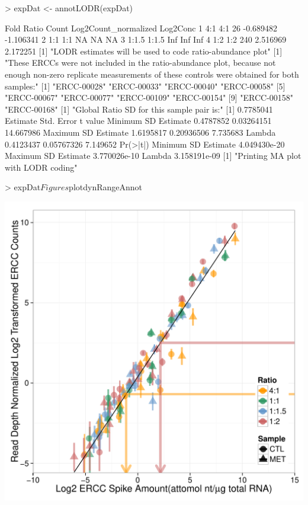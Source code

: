 \documentclass{article}
\begin{document}
\begin{Schunk}
\begin{Sinput}
> expDat <- annotLODR(expDat)
\end{Sinput}
\begin{Soutput}
   Fold Ratio Count Log2Count_normalized  Log2Conc
1   4:1   4:1    26            -0.689482 -1.106341
2   1:1   1:1    NA                   NA        NA
3 1:1.5 1:1.5   Inf                  Inf       Inf
4   1:2   1:2   240             2.516969  2.172251
[1] "LODR estimates will be used to code ratio-abundance plot"
[1] "These ERCCs were not included in the ratio-abundance plot,  because not enough non-zero replicate measurements of these  controls were obtained for both samples:"
 [1] "ERCC-00028" "ERCC-00033" "ERCC-00040" "ERCC-00058"
 [5] "ERCC-00067" "ERCC-00077" "ERCC-00109" "ERCC-00154"
 [9] "ERCC-00158" "ERCC-00168"
[1] "Global Ratio SD for this sample pair is:"
[1] 0.7785041
                     Estimate Std. Error   t value
Minimum SD Estimate 0.4787852 0.03264151 14.667986
Maximum SD Estimate 1.6195817 0.20936506  7.735683
Lambda              0.4123437 0.05767326  7.149652
                        Pr(>|t|)
Minimum SD Estimate 4.049430e-20
Maximum SD Estimate 3.770026e-10
Lambda              3.158191e-09
[1] "Printing MA plot with LODR coding"
\end{Soutput}
\end{Schunk}
\begin{center}
\begin{Schunk}
\begin{Sinput}
> expDat$Figures$plotdynRangeAnnot
\end{Sinput}
\end{Schunk}
\includegraphics{erccdashboardVignette-printPanelD}
\end{center}
\end{document}

